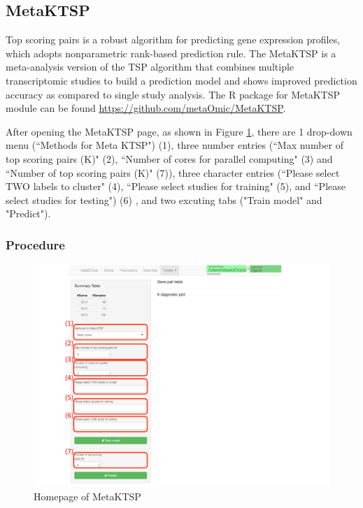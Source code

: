 \subsection{MetaKTSP}

Top scoring pairs is a robust algorithm for predicting gene expression profiles,
which adopts nonparametric rank-based prediction rule.
The MetaKTSP is a meta-analysis version of the TSP algorithm that combines multiple transcriptomic studies to build a prediction model and shows improved 
prediction accuracy as compared to single study analysis.
The R package for MetaKTSP module can be found \url{https://github.com/metaOmic/MetaKTSP}.

After opening the MetaKTSP page, as shown in Figure \ref{fig:MetaKTSPmainpage}, there are 1 drop-down menu (``Methods for Meta KTSP") {\color{red} (1)}, three number entries (``Max number of top scoring pairs (K)" {\color{red} (2)}, ``Number of cores for parallel computing" {\color{red} (3)} and ``Number of top scoring pairs (K)" {\color{red} (7)}), three character entries (``Please select TWO labels to cluster" {\color{red} (4)}, ``Please select studies for training" {\color{red} (5)}, and ``Please select studies for testing") {\color{red} (6)} , and two excuting tabs ("Train model" and "Predict"). 

\subsubsection{Procedure}

\begin{figure}[H]
\begin{center}
\includegraphics[scale=0.4]{./figure/MetaKTSP/metaKTSPprocedure}
\caption{Homepage of MetaKTSP}
\label{fig:MetaKTSPmainpage}
\end{center}
\end{figure}

